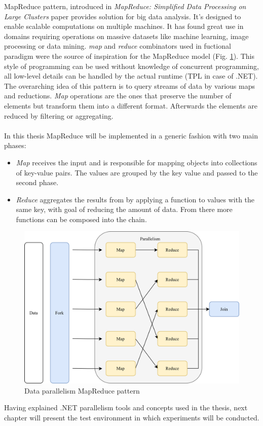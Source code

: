 MapReduce pattern, introduced in \emph{MapReduce: Simplified
Data Processing on Large Clusters} \cite{MapReduce} paper provides solution for big data analysis. It's designed to enable scalable computations on multiple machines. It has found great use in domains requiring operations on massive datasets like machine learning, image processing or data mining.
\emph{map} and \emph{reduce} combinators used in fuctional paradigm were the source of inspiration for the MapReduce model (Fig. \ref{fig:MapReduce}). This style of programming can be used without knowledge of concurrent programming, all low-level details can be handled by the actual runtime (TPL in case of .NET).
The overarching idea of this pattern is to query streams of data by various maps and reductions. \emph{Map} operations are the ones that preserve the number of elements but transform them into a different format. Afterwards the elements are reduced by filtering or aggregating. 
\\ \\
In this thesis MapReduce will be implemented in a generic fashion with two main phases:
\begin{itemize}
	\item \emph{Map} receives the input and is responsible for mapping objects into collections of key-value pairs. The values are grouped by the key value and passed to the second phase.
\item \emph{Reduce} aggregates the results from  by applying a function to values with the same key, with goal of reducing the amount of data. From there more functions can be composed into the chain.
\end{itemize}

\begin{figure}[htb]
	\centering
		\includegraphics[scale=1.0]{figures02/mapreduce.png}
		\caption{Data parallelism MapReduce pattern}
		\label{fig:MapReduce}
\end{figure}

Having explained .NET parallelism tools and concepts used in the thesis, next chapter will present the test environment in which experiments will be conducted. 
